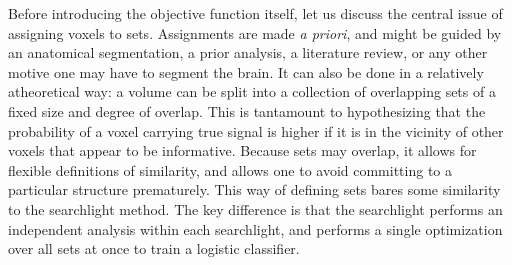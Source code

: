 Before introducing the objective function itself, let us discuss the central issue of assigning voxels to sets. Assignments are made {\em a priori}, and might be guided by an anatomical segmentation, a prior analysis, a literature review, or any other motive one may have to segment the brain. It can also be done in a relatively atheoretical way: a volume can be split into a collection of overlapping sets of a fixed size and degree of overlap. This is tantamount to hypothesizing that the probability of a voxel carrying true signal is higher if it is in the vicinity of other voxels that appear to be informative. Because sets may overlap, it allows for flexible definitions of similarity, and allows one to avoid committing to a particular structure prematurely. This way of defining sets bares some similarity to the searchlight method. The key difference is that the searchlight performs an independent analysis within each searchlight, and {\soslasso} performs a single optimization over all sets at once to train a logistic classifier.


